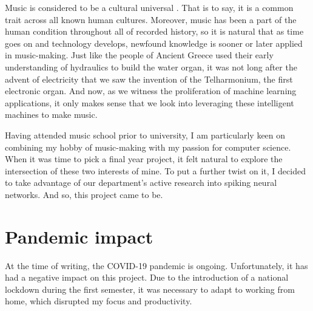 \documentclass[../../report.tex]{subfiles}
\begin{document}
Music is considered to be a cultural universal \cite{Mehr2019}. That is to say,
it is a common trait across all known human cultures. Moreover, music has been a
part of the human condition throughout all of recorded history, so it is natural
that as time goes on and technology develops, newfound knowledge is sooner or
later applied in music-making. Just like the people of Ancient Greece used their
early understanding of hydraulics to build the water organ, it was not long
after the advent of electricity that we saw the invention of the Telharmonium,
the first electronic organ. And now, as we witness the proliferation of machine
learning applications, it only makes sense that we look into leveraging these
intelligent machines to make music.

Having attended music school prior to university, I am particularly keen on
combining my hobby of music-making with my passion for computer science. When it
was time to pick a final year project, it felt natural to explore the
intersection of these two interests of mine. To put a further twist on it, I
decided to take advantage of our department's active research into spiking
neural networks. And so, this project came to be.

\section{Pandemic impact}

At the time of writing, the COVID-19 pandemic is ongoing. Unfortunately, it has
had a negative impact on this project. Due to the introduction of a national
lockdown during the first semester, it was necessary to adapt to working from
home, which disrupted my focus and productivity.
\end{document}
